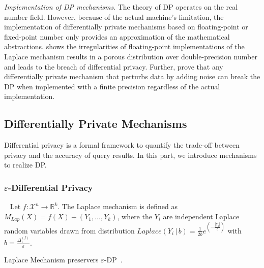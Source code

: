 \emph{Implementation of DP mechanisms}. The theory of DP operates on the real number field. However, because of the actual machine's limitation, the implementation of differentially private mechanisms based on floating-point or fixed-point number only provides an approximation of the mathematical abstractions. \cite{mironov2012significance} shows the irregularities of floating-point implementations of the Laplace mechanism results in a porous distribution over double-precision number and leads to the breach of differential privacy. Further, \cite{gazeau2016preserving} prove that any differentially private mechanism that perturbs data by adding noise can break the DP when implemented with a finite precision regardless of the actual implementation.

\subsection{Differentially Private Mechanisms}
\label{subsec:DPMechanisms}

Differential privacy is a formal framework to quantify the trade-off between privacy and the accuracy of query results. In this part, we introduce mechanisms to realize DP.

\subsubsection{$\varepsilon$-Differential Privacy}
\begin{definition}\
    \label{def:laplaceMechanism}
    Let $f : \mathcal{X}^{n} \rightarrow \mathbb{R}^{k}$. The Laplace mechanism is defined as $M_{Lap}\left( X\right) =f\left( X\right) +\left( Y_{1},\ldots ,Y_{k}\right) $, where the $Y_{i}$ are independent Laplace random variables drawn from distribution $Laplace \left(  Y_{i}\,|\, b\right) =\frac{1}{2b}e^{\left( -\frac{\left  | Y_{i}\right|}{b}\right)} $ with $b=\frac{\Delta _{1}^{\left(f\right)}}{\varepsilon }$.
\end{definition}

\begin{theorem}
    Laplace Mechanism preservers $\varepsilon$-DP~\cite{dwork2014algorithmic}.
\end{theorem}




